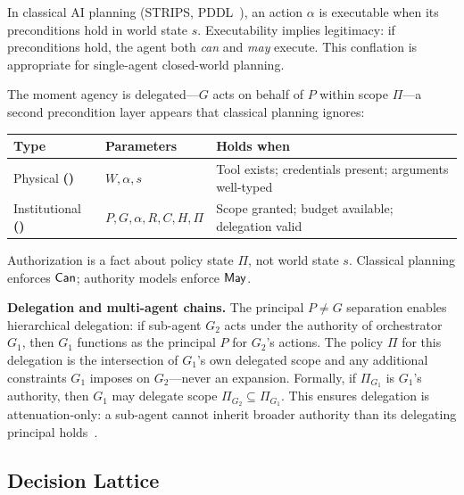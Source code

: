 \documentclass[11pt,a4paper]{article}
\newcommand{\termlabel}[1]{\ifmmode\mathsf{#1}\else{\normalfont\textsc{\MakeLowercase{#1}}}\fi}
\newcommand{\May}{\termlabel{May}}
\newcommand{\Can}{\termlabel{Can}}
\begin{document}
\begin{tcolorbox}[colback=lightgray, colframe=darkblue, title={\textbf{Can and May as Precondition Types}}, fonttitle=\small\bfseries, boxrule=0.4pt, left=4pt, right=4pt, top=4pt, bottom=4pt]
In classical AI planning (STRIPS, PDDL~\citep{mcdermott1998pddl}), an action $\alpha$ is executable when its preconditions hold in world state $s$. Executability implies legitimacy: if preconditions hold, the agent both \emph{can} and \emph{may} execute. This conflation is appropriate for single-agent closed-world planning.

The moment agency is delegated---$G$ acts on behalf of $P$ within scope $\Pi$---a second precondition layer appears that classical planning ignores:

\begin{center}
\small
\begin{tabular}{@{}l l p{5.2cm}@{}}
\toprule
\textbf{Type} & \textbf{Parameters} & \textbf{Holds when} \\
\midrule
Physical \textbf{(\Can)} & $W, \alpha, s$ & Tool exists; credentials present; arguments well-typed \\
Institutional \textbf{(\May)} & $P, G, \alpha, R, C, H, \Pi$ & Scope granted; budget available; delegation valid \\
\bottomrule
\end{tabular}
\end{center}

Authorization is a fact about policy state $\Pi$, not world state $s$. Classical planning enforces $\Can$; authority models enforce $\May$.
\end{tcolorbox}

\noindent\textbf{Delegation and multi-agent chains.} The principal $P \neq G$ separation enables hierarchical delegation: if sub-agent $G_2$ acts under the authority of orchestrator $G_1$, then $G_1$ functions as the principal $P$ for $G_2$'s actions. The policy $\Pi$ for this delegation is the intersection of $G_1$'s own delegated scope and any additional constraints $G_1$ imposes on $G_2$---never an expansion. Formally, if $\Pi_{G_1}$ is $G_1$'s authority, then $G_1$ may delegate scope $\Pi_{G_2} \subseteq \Pi_{G_1}$. This ensures delegation is attenuation-only: a sub-agent cannot inherit broader authority than its delegating principal holds~\citep{miller2006robust}.

\subsection{Decision Lattice}
\end{document}
